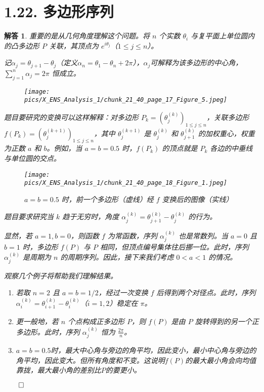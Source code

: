 \documentclass[12pt,UTF8]{ctexbook}
\theoremstyle{exercisestyle}
\theoremstyle{solutionstyle}
\newtheorem*{solution*}{解答}
\newenvironment{solution}
  {\begin{solution*}}
  {\hfill\ensuremath{\qed}\end{solution*}}
\begin{document}
\section{1.22. 多边形序列}
\begin{solution}
重要的是从几何角度理解这个问题。将 \(n\) 个实数 \(\theta_i\) 与复平面上单位圆内的凸多边形 \(P\) 关联，其顶点为 \(e^{i\theta_j}\)（\(1 \leq j \leq n\)）。

记\(\alpha_j = \theta_{j+1} - \theta_j\)（定义\(\alpha_n = \theta_1 - \theta_n + 2\pi\)），$\alpha_j$可解释为该多边形的中心角， \(\sum_{j=1}^{n} \alpha_j = 2\pi\) 恒成立。
\begin{figure}[htbp]
    \centering
    \texttt{[image: pics/X\_ENS\_Analysis\_1/chunk\_21\_40\_page\_17\_Figure\_5.jpeg]}
\end{figure}

题目要研究的变换可以这样解释：对多边形 \(P_k = (\theta_j^{(k)})_{1 \leq j \leq n}\)，关联多边形 \(f(P_k) = (\theta_j^{(k+1)})_{1 \leq j \leq n}\)，其中 \(\theta_j^{(k+1)}\) 是 \(\theta_j^{(k)}\) 和 \(\theta_{j+1}^{(k)}\) 的加权重心，权重为正数 \(a\) 和 \(b\)。例如，当 \(a = b = 0.5\) 时，\(f(P_k)\) 的顶点就是 \(P_k\) 各边的中垂线与单位圆的交点。
\begin{figure}[htbp]
    \centering
    \texttt{[image: pics/X\_ENS\_Analysis\_1/chunk\_21\_40\_page\_18\_Figure\_1.jpeg]}
    \caption*{ \(a = b =0.5\) 时，前一个多边形（虚线）经 \(f\) 变换后的图像（实线）}
\end{figure}

题目要求研究当 \(k\) 趋于无穷时，角度 \(\alpha_j^{(k)} = \theta_{j+1}^{(k)} - \theta_j^{(k)}\) 的行为。

显然，若 \(a = 1, b = 0\)，则函数 \(f\) 为常函数，序列 \(\alpha_j^{(k)}\) 也是常数列。当 \(a = 0\) 且 \(b = 1\) 时，多边形 \(f(P)\) 与 \(P\) 相同，但顶点编号集体往后挪一位。此时，序列 \(\alpha_j^{(k)}\) 是周期为 \(n\) 的周期序列。因此，接下来我们考虑 \(0 < a < 1\) 的情况。

观察几个例子将帮助我们理解结果。
\begin{enumerate}[label=\arabic*.]
  \item 若取 \(n = 2\) 且 \(a = b = 1/2\)，经过一次变换 \(f\) 后得到两个对径点。此时，序列 \(\alpha_i^{(k)} = \theta_{i+1}^{(k)} - \theta_i^{(k)}\)（\(i = 1, 2\)）稳定在 \(\pi\)。
  \item 更一般地，若 \(n\) 个点构成正多边形 \(P\)，则 \(f(P)\) 是由 \(P\) 旋转得到的另一个正多边形。此时，序列 \(\alpha_j^{(k)}\) 恒为 \(\frac{2\pi}{n}\)。
  \item $a = b = 0.5$时，最大中心角与旁边的角平均，因此变小，最小中心角与旁边的角平均，因此变大。但所有角度和不变。这说明$f(P)$的最大最小角会向均值靠拢，最大最小角的差别比$P$的要更小。
\end{enumerate}


\end{solution}
\end{document}
